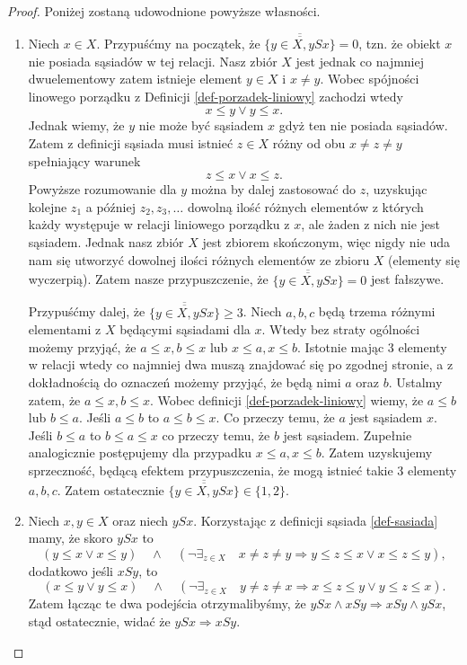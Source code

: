 \documentclass[12pt,a4paper]{report}
\newcommand{\licznosc}[1]{\overline{\overline{#1}}}
\begin{document}
\begin{proof}
Poniżej zostaną udowodnione powyższe własności.
\begin{enumerate}
\item Niech $x \in X$. Przypuśćmy na początek, że $\licznosc{\{y \in X, ySx\}} = 0$, tzn. że obiekt $x$ nie posiada sąsiadów w tej relacji. Nasz zbiór $X$ jest jednak co najmniej dwuelementowy zatem istnieje element $y \in X$ i $ x \neq y$. Wobec spójności linowego porządku z Definicji \ref{def-porzadek-liniowy} zachodzi wtedy
$$ x \leq y \lor y \leq x.$$
Jednak wiemy, że $y$ nie może być sąsiadem $x$ gdyż ten nie posiada sąsiadów. Zatem z definicji sąsiada musi istnieć $z \in X$ różny od obu $x \neq z \neq y$ spełniający warunek
$$
z \leq x \lor x \leq z.
$$
Powyższe rozumowanie dla $y$ można by dalej zastosować do $z$, uzyskując kolejne $z_1$ a później $z_2,z_3, \ldots$ dowolną ilość różnych elementów z których każdy występuje w relacji liniowego porządku z $x$, ale żaden z nich nie jest sąsiadem. Jednak nasz zbiór $X$ jest zbiorem skończonym, więc nigdy nie uda nam się utworzyć dowolnej ilości różnych elementów ze zbioru $X$ (elementy się wyczerpią). Zatem nasze przypuszczenie, że $\licznosc{\{y \in X, ySx\}} = 0$ jest fałszywe.

Przypuśćmy dalej, że $\licznosc{\{y \in X, ySx\}} \geq 3$. Niech $a,b,c$ będą trzema różnymi elementami z $X$ będącymi sąsiadami dla $x$. Wtedy bez straty ogólności możemy przyjąć, że $a \leq x, b \leq x$ lub $x \leq a, x \leq b$. Istotnie mając 3 elementy w relacji wtedy co najmniej dwa muszą znajdować się po zgodnej stronie, a z dokładnością do oznaczeń możemy przyjąć, że będą nimi $a$ oraz $b$. Ustalmy zatem, że $a \leq x, b \leq x$. Wobec definicji \ref{def-porzadek-liniowy} wiemy, że $a \leq b$ lub $b \leq a$. Jeśli $a \leq b$ to $a \leq b \leq x$. Co przeczy temu, że $a$ jest sąsiadem $x$. Jeśli $b \leq a$ to $b \leq a \leq x$ co przeczy temu, że $b$ jest sąsiadem. Zupełnie analogicznie postępujemy dla przypadku $x \leq a, x \leq b$. Zatem uzyskujemy sprzeczność, będącą efektem przypuszczenia, że mogą istnieć takie 3 elementy $a,b,c$. Zatem ostatecznie $\licznosc{\{y \in X, ySx\}} \in \{ 1,2 \}$.

\item Niech $x,y \in X$ oraz niech $ySx$. Korzystając z definicji sąsiada \ref{def-sasiada} mamy, że skoro $ySx$ to  $$\left(y \leq x \lor x\leq y \right)\quad \land \quad  \left(\lnot \exists_{z \in X}  \quad x\neq z \neq y \Rightarrow   y \leq z \leq x \lor x \leq z \leq y \right),$$ dodatkowo jeśli $xSy$, to $$\left(x \leq y \lor y\leq x \right)\quad \land \quad  \left(\lnot \exists_{z \in X}  \quad y\neq z \neq x \Rightarrow   x \leq z \leq y \lor y \leq z \leq x \right).$$ Zatem łącząc te dwa podejścia otrzymalibyśmy, że $ySx \land xSy \Rightarrow xSy \land ySx$, stąd ostatecznie, widać że  $ySx \Rightarrow xSy$. %


\end{enumerate}
\end{proof}
\end{document}
